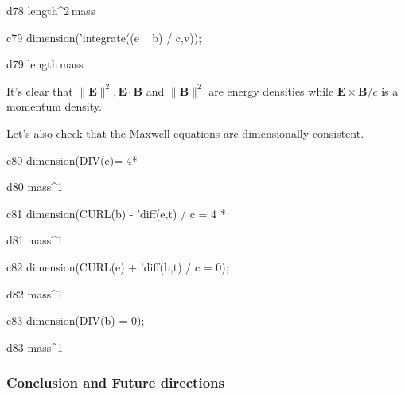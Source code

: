 \documentclass[12pt]{article}
\begin{document}
\begin{mdline}{d78}
{{length^2\,mass}}
\end{mdline}

\begin{mcline}{c79}
 dimension('integrate((e ~ b) / c,v));
\end{mcline}


\begin{mdline}{d79}
{{length\,mass}}
\end{mdline}

\noindent It's clear that $\| \mathbf{E} \|^2, \mathbf{E} \cdot \mathbf{B}$
and $\| \mathbf{B} \|^2$ are energy densities while
$\mathbf{E} \times \mathbf{B} / c$ is a momentum density.

Let's also check that the Maxwell equations are
dimensionally consistent.

\begin{mcline}{c80}
dimension(DIV(e)= 4*%
\end{mcline}

\begin{mdline}{d80}
{{mass^{{{1}}}}}
\end{mdline}

\begin{mcline}{c81}
dimension(CURL(b) - 'diff(e,t) / c = 4 * %
\end{mcline}

\begin{mdline}{d81}
{{mass^{{{1}}}}}
\end{mdline}

\begin{mcline}{c82}
dimension(CURL(e) + 'diff(b,t) / c = 0);
\end{mcline}

\begin{mdline}{d82}
{{mass^{{{1}}}}}
\end{mdline}

\begin{mcline}{c83}
dimension(DIV(b) = 0);
\end{mcline}

\begin{mdline}{d83}
{{mass^{{{1}}}}}
\end{mdline}


\subsubsection*{Conclusion and Future directions}
\end{document}
